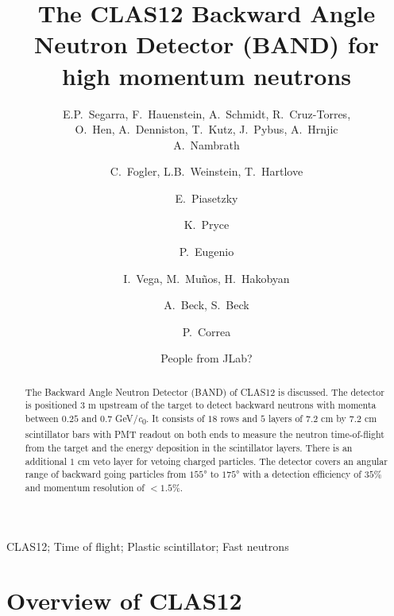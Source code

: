 \documentclass[review]{elsarticle}
\newcommand*{\MIT }{Massachusetts Institute of Technology, Cambridge, Massachusetts 02139, USA}
\newcommand*{\ODU}{Old Dominion University, Norfolk, Virginia 23529}
\newcommand*{\TAU }{School of Physics and Astronomy, Tel Aviv University, Tel Aviv 69978, Israel}
\begin{document}
\begin{frontmatter}

\title{The CLAS12 Backward Angle Neutron Detector (BAND) for high momentum neutrons}

\author{E.P.~Segarra, F.~Hauenstein, A.~Schmidt, R.~Cruz-Torres, \\O.~Hen, A.~Denniston, T.~Kutz, J.~Pybus, A.~Hrnjic\\A.~Nambrath}
\address{\MIT}
\author{C.~Fogler, L.B.~Weinstein, T.~Hartlove}
\address{\ODU}
\author{E.~Piasetzky}
\address{\TAU}
\author{K.~Pryce}
\address{Orsay}
\author{P.~Eugenio}
\address{FSU}
\author{I.~Vega, M.~Mu\~nos, H.~Hakobyan}
\address{UTFSM}
\author{A.~Beck, S.~Beck}
\address{}
\author{P.~Correa}
\address{}
\author{People from JLab?}
\address{}

\author[]{}
\ead[]{}

\begin{abstract}
The Backward Angle Neutron Detector (BAND) of CLAS12 is discussed. The detector is positioned $3$ \si{\meter} upstream of the target to 
detect backward neutrons with momenta between $0.25$ and $0.7$ \si{\GeV/\clight}. It consists of $18$ rows and $5$ layers of $7.2$ \si{\centi\meter} 
by $7.2$ \si{\centi\meter} scintillator bars with PMT readout on both ends to measure the neutron time-of-flight from the target and the 
energy deposition in the scintillator layers. There is an additional $1$ \si{\centi\meter} veto layer for vetoing charged particles. The detector 
covers an angular range of backward going particles from $155$\si{\degree} to $175$\si{\degree} with a detection efficiency of 
$35$\% and momentum resolution of $<1.5$\%.
\end{abstract}

\begin{keyword}
CLAS12; Time of flight; Plastic scintillator; Fast neutrons
\end{keyword}
\end{frontmatter}

\linenumbers

\section{Overview of CLAS12}
\end{document}
